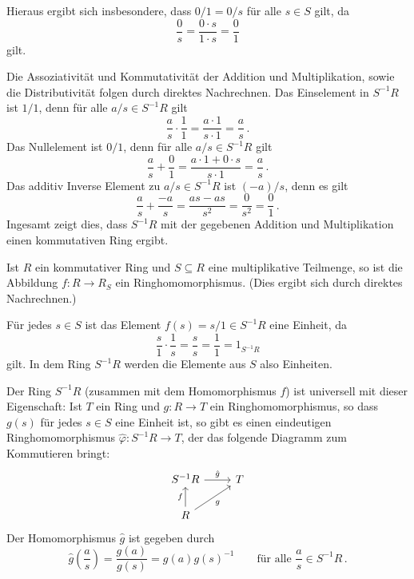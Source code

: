 Hieraus ergibt sich insbesondere, dass $0/1 = 0/s$ für alle $s \in S$ gilt, da
\[
    \frac{0}{s}
  = \frac{0 \cdot s}{1 \cdot s}
  = \frac{0}{1}
\]
gilt.

Die Assoziativität und Kommutativität der Addition und Multiplikation, sowie die Distributivität folgen durch direktes Nachrechnen.
Das Einselement in $S^{-1} R$ ist $1/1$, denn für alle $a/s \in S^{-1} R$ gilt
\[
    \frac{a}{s} \cdot \frac{1}{1}
  = \frac{a \cdot 1}{s \cdot 1}
  = \frac{a}{s} \,.
\]
Das Nullelement ist $0/1$, denn für alle $a/s \in S^{-1} R$ gilt
\[
    \frac{a}{s} + \frac{0}{1}
  = \frac{a \cdot 1 + 0 \cdot s}{s \cdot 1}
  = \frac{a}{s} \,.
\]
Das additiv Inverse Element zu $a/s \in S^{-1} R$ ist $(-a)/s$, denn es gilt
\[
    \frac{a}{s} + \frac{-a}{s}
  = \frac{a s - a s}{s^2}
  = \frac{0}{s^2}
  = \frac{0}{1} \,.
\]
Ingesamt zeigt dies, dass $S^{-1} R$ mit der gegebenen Addition und Multiplikation einen kommutativen Ring ergibt.

\begin{remark}
  Ist $R$ ein kommutativer Ring und $S \subseteq R$ eine multiplikative Teilmenge, so ist die Abbildung $f \colon R \to R_S$ ein Ringhomomorphismus.
  (Dies ergibt sich durch direktes Nachrechnen.)
  
  Für jedes $s \in S$ ist das Element $f(s) = s/1 \in S^{-1} R$ eine Einheit, da
  \[
      \frac{s}{1} \cdot \frac{1}{s}
    = \frac{s}{s}
    = \frac{1}{1}
    = 1_{S^{-1} R}
  \]
  gilt.
  In dem Ring $S^{-1} R$ werden die Elemente aus $S$ also Einheiten.
  
  Der Ring $S^{-1} R$ (zusammen mit dem Homomorphismus $f$) ist universell mit dieser Eigenschaft:
  Ist $T$ ein Ring und $g \colon R \to T$ ein Ringhomomorphismus, so dass $g(s)$ für jedes $s \in S$ eine Einheit ist, so gibt es einen eindeutigen Ringhomomorphismus $\hat{\varphi} \colon S^{-1} R \to T$, der das folgende Diagramm zum Kommutieren bringt:
  \[
    \begin{tikzcd}
        S^{-1} R
        \arrow{r}{\hat{g}}
      & T
      \\
        R
        \arrow{u}{f}
        \arrow[swap]{ru}{g}
      & {}
    \end{tikzcd}
  \]
  Der Homomorphismus $\hat{g}$ ist gegeben durch
  \[
      \hat{g}\left( \frac{a}{s} \right)
    = \frac{g(a)}{g(s)}
    = g(a) g(s)^{-1}
    \qquad
    \text{für alle $\frac{a}{s} \in S^{-1} R$} \,.
  \]
\end{remark}

